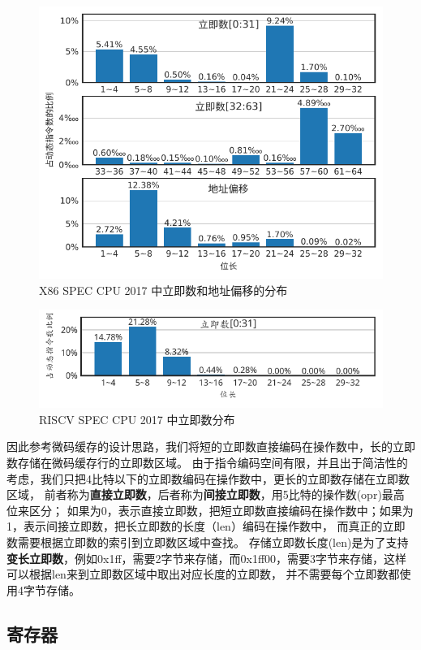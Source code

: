 \begin{figure}[h]
  \centering
  \includegraphics[width=0.8\linewidth]{./plot_pdf/immsize_x86.pdf}
  \caption{X86 SPEC CPU 2017 中立即数和地址偏移的分布}
  \label{img:immsize_x86}
\end{figure}

\begin{figure}[h]
  \centering
  \includegraphics[width=0.8\linewidth]{./plot_pdf/immsize_riscv.pdf}
  \caption{RISCV SPEC CPU 2017 中立即数分布}
  \label{img:immsize_riscv}
\end{figure}

因此参考微码缓存的设计思路，我们将短的立即数直接编码在操作数中，长的立即数存储在微码缓存行的立即数区域。
由于指令编码空间有限，并且出于简洁性的考虑，我们只把4比特以下的立即数编码在操作数中，更长的立即数存储在立即数区域，
前者称为\textbf{直接立即数}，后者称为\textbf{间接立即数}，用5比特的操作数(opr)最高位来区分；
如果为0，表示直接立即数，把短立即数直接编码在操作数中；如果为1，表示间接立即数，把长立即数的长度（len）编码在操作数中，
而真正的立即数需要根据立即数的索引到立即数区域中查找。
存储立即数长度(len)是为了支持\textbf{变长立即数}，例如0x1ff，需要2字节来存储，而0x1ff00，需要3字节来存储，这样可以根据len来到立即数区域中取出对应长度的立即数，
并不需要每个立即数都使用4字节存储。


\subsection{寄存器}

